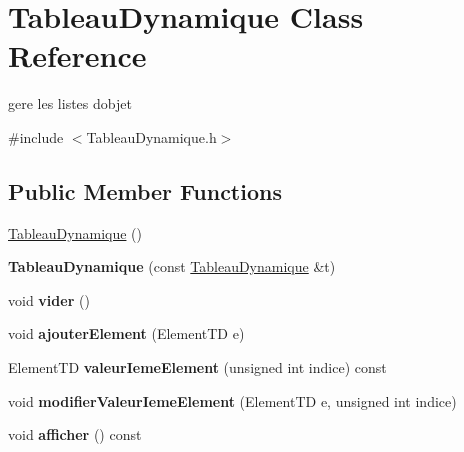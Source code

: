 \hypertarget{classTableauDynamique}{}\section{Tableau\+Dynamique Class Reference}
\label{classTableauDynamique}


gere les listes d\textquotesingle{}objet  




{\ttfamily \#include $<$Tableau\+Dynamique.\+h$>$}

\subsection*{Public Member Functions}
\begin{DoxyCompactItemize}
\item 
\hyperlink{classTableauDynamique_a9b1371952458a1b1b528dda5eff3cab4}{Tableau\+Dynamique} ()
\item 
{\bfseries Tableau\+Dynamique} (const \hyperlink{classTableauDynamique}{Tableau\+Dynamique} \&t)\hypertarget{classTableauDynamique_a3eb7e3d118ca6360f6356343d5a354e0}{}\label{classTableauDynamique_a3eb7e3d118ca6360f6356343d5a354e0}

\item 
void {\bfseries vider} ()\hypertarget{classTableauDynamique_a9eb09425f64ac6767fb24040c6ad612c}{}\label{classTableauDynamique_a9eb09425f64ac6767fb24040c6ad612c}

\item 
void {\bfseries ajouter\+Element} (Element\+TD e)\hypertarget{classTableauDynamique_af0e3d25237cf2959ad90727495fa41a0}{}\label{classTableauDynamique_af0e3d25237cf2959ad90727495fa41a0}

\item 
Element\+TD {\bfseries valeur\+Ieme\+Element} (unsigned int indice) const \hypertarget{classTableauDynamique_a15b0f26a4ec823e048ae36d60e2450a8}{}\label{classTableauDynamique_a15b0f26a4ec823e048ae36d60e2450a8}

\item 
void {\bfseries modifier\+Valeur\+Ieme\+Element} (Element\+TD e, unsigned int indice)\hypertarget{classTableauDynamique_a664ad3d6d76699f91f9fc952751c801f}{}\label{classTableauDynamique_a664ad3d6d76699f91f9fc952751c801f}

\item 
void {\bfseries afficher} () const \hypertarget{classTableauDynamique_ac3951450e23d30180a0c1e275bef001f}{}\label{classTableauDynamique_ac3951450e23d30180a0c1e275bef001f}


\end{DoxyCompactItemize}
